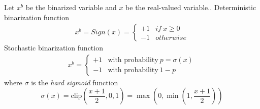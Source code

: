 Let $ x^b $ be the binarized variable and $ x $ be the real-valued variable.. Deterministic binarization function
\begin{equation}
	\begin{split}
		x^b = Sign(x) = 
		\begin{cases}
				+1 & if\ x\ge 0 \\
				-1 & otherwise
		\end{cases}
	\end{split}
\end{equation}
Stochastic binarization function
\begin{equation}
	\begin{split}
		x^b = \begin{cases}
			+1 & \mbox{with probability}\ p =\sigma(x)\\
			-1 & \mbox{with probability}\ 1-p
		\end{cases}
	\end{split}
\end{equation}
where $ \sigma  $ is the \textit{hard sigmoid} function
\[\sigma(x) = \mbox{clip}(\frac{x+1}{2},0,1) = \max (0, \min(1,\frac{x+1}{2}))\]


\cite{BNN}





